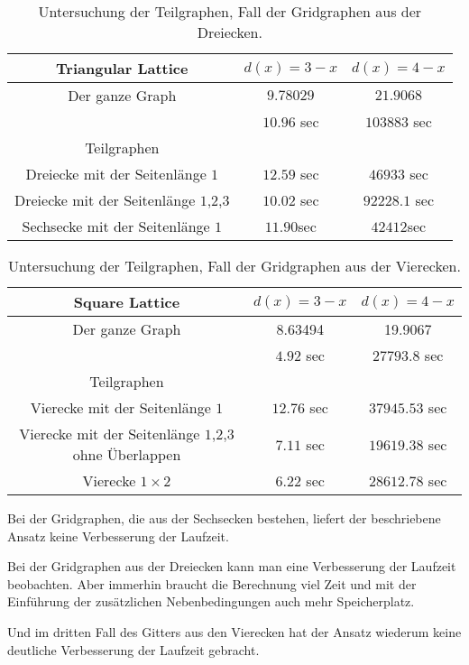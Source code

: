 \documentclass[
	fontsize=12pt,
	paper=a4,
	twoside=false,
	numbers=noenddot,
	plainheadsepline,
	toc=listof,
	toc=bibliography
]{scrartcl}
\begin{document}
\begin{itemize}
	\begin{table}[htbp]
	\centering
	\begin{tabular}{|c|c|c|}
		\hline Triangular Lattice& $d(x)=3-x$  & $d(x)=4-x$\\ \hline 
		Der ganze Graph&  $9.78029$	& $21.9068$ \\ 
			& $10.96$ sec	& $103883$ sec \\ \hline
		Teilgraphen & & \\\hline
		Dreiecke mit der Seitenlänge $1$& $12.59$ sec	& $46933$ sec \\ \hline
		Dreiecke mit der Seitenlänge $1$,$2$,$3$& $10.02$ sec	& $92228.1$ sec \\ \hline
		Sechsecke mit der Seitenlänge $1$ &  $11.90$sec	&  $42412$sec \\ \hline
	\end{tabular}
	\caption{Untersuchung der Teilgraphen, Fall der Gridgraphen aus der Dreiecken.}
	\label{Table:TG2}
	\end{table}
	
	
	\begin{table}[htbp]
	\centering
	\begin{tabular}{|c|c|c|}
	\hline Square Lattice& $d(x)=3-x$  & $d(x)=4-x$\\ \hline 
		Der ganze Graph	&  8.63494	& 19.9067 \\ 
			& $4.92$ sec	& $27793.8$ sec \\ \hline
		Teilgraphen & & \\ \hline
		Vierecke mit der Seitenlänge $1$& $12.76$ sec	& $37945.53$ sec \\ \hline
		Vierecke mit der Seitenlänge $1$,$2$,$3$ ohne Überlappen& $7.11$ sec	& $19619.38$ sec \\ \hline
		Vierecke $1\times 2$ & $6.22$ sec	& $28612.78$ sec \\ \hline
	\end{tabular}
	\caption{Untersuchung der Teilgraphen, Fall der Gridgraphen aus der Vierecken.} 
	\label{Table:TG3}
	\end{table}

	Bei der Gridgraphen, die aus der Sechsecken bestehen, liefert der beschriebene Ansatz keine Verbesserung der Laufzeit.
	
	Bei der Gridgraphen aus der Dreiecken kann man eine Verbesserung der Laufzeit beobachten. Aber immerhin braucht die Berechnung viel Zeit und mit der Einführung der zusätzlichen Nebenbedingungen auch mehr Speicherplatz. 
	
	Und im dritten Fall des Gitters aus den Vierecken hat der Ansatz wiederum keine deutliche Verbesserung der Laufzeit gebracht.

\end{itemize}
\FloatBarrier 
\newpage
{}



\end{document}
